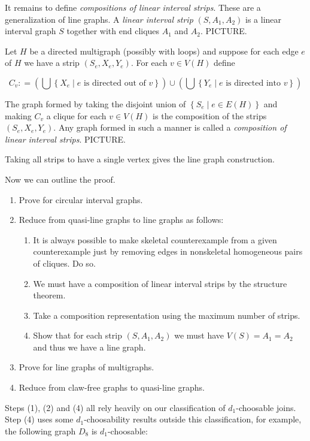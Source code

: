 \documentclass[12pt]{article}
\theoremstyle{plain}
\theoremstyle{definition}
\theoremstyle{remark}
\newcommand{\setbs}[2]{\left\{ #1 \mid #2 \right\}}
\newcommand{\parens}[1]{\left( #1 \right)}
\newcommand{\DefinedAs}{\mathrel{\mathop:}=}
\begin{document}
\bigskip

It remains to define \emph{compositions of linear interval strips}.  These are a generalization of line graphs. 
A \emph{linear interval strip} $(S, A_1, A_2)$ is a linear interval graph $S$ together with end cliques $A_1$ and $A_2$.  PICTURE.

\bigskip

Let $H$ be a directed multigraph (possibly with loops)
and suppose for each edge $e$ of $H$ we have a strip $(S_e, X_e, Y_e)$.  For
each $v \in V(H)$ define

\[C_v \DefinedAs \parens{\bigcup \setbs{X_e}{\text{$e$ is directed out of $v$}}}
\cup \parens{\bigcup \setbs{Y_e}{\text{$e$ is directed into $v$}}}\]

The graph formed by taking the disjoint union of $\setbs{S_e}{e \in E(H)}$ and
making $C_v$ a clique for each $v \in V(H)$ is the composition of the strips
$(S_e, X_e, Y_e)$.  Any graph formed in such a manner is called a
\emph{composition of linear interval strips}.  PICTURE.

Taking all strips to have a single vertex gives the line graph construction.

\bigskip\bigskip

Now we can outline the proof.

\begin{enumerate}
\item Prove for circular interval graphs.
\item Reduce from quasi-line graphs to line graphs as follows:
	\begin{enumerate}
	\item It is always possible to make skeletal counterexample from a given counterexample just by removing edges in nonskeletal homogeneous pairs of cliques.  Do so.
	\item We must have a composition of linear interval strips by the structure theorem.
	\item Take a composition representation using the maximum number of strips.
	\item Show that for each strip $(S, A_1, A_2)$ we must have $V(S) = A_1 = A_2$ and thus we have a line graph.
	\end{enumerate}
\item Prove for line graphs of multigraphs.
\item Reduce from claw-free graphs to quasi-line graphs.
\end{enumerate}

Steps (1), (2) and (4) all rely heavily on our classification of $d_1$-choosable joins.  Step (4) uses some $d_1$-choosability results outside this classification, for example, the following graph $D_8$ is $d_1$-choosable:
\end{document}
